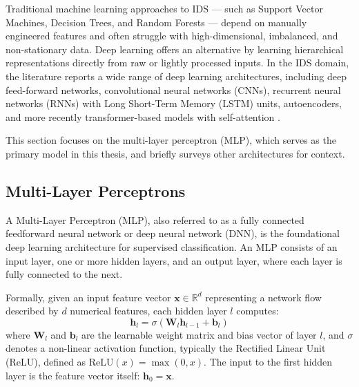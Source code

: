 \par Traditional machine learning approaches to IDS --- such as Support Vector Machines, Decision Trees, and Random Forests --- depend on manually engineered features and often struggle with high-dimensional, imbalanced, and non-stationary data. Deep learning offers an alternative by learning hierarchical representations directly from raw or lightly processed inputs. In the IDS domain, the literature reports a wide range of deep learning architectures, including deep feed-forward networks, convolutional neural networks (CNNs), recurrent neural networks (RNNs) with Long Short-Term Memory (LSTM) units, autoencoders, and more recently transformer-based models with self-attention \cite{Lansky2021, Zhang2025}.

\par This section focuses on the multi-layer perceptron (MLP), which serves as the primary model in this thesis, and briefly surveys other architectures for context.

\subsection{Multi-Layer Perceptrons}
\label{subsec:mlp}

\par A Multi-Layer Perceptron (MLP), also referred to as a fully connected feedforward neural network or deep neural network (DNN), is the foundational deep learning architecture for supervised classification. An MLP consists of an input layer, one or more hidden layers, and an output layer, where each layer is fully connected to the next.

\par Formally, given an input feature vector $\mathbf{x} \in \mathbb{R}^d$ representing a network flow described by $d$ numerical features, each hidden layer $l$ computes:
\begin{equation}
    \mathbf{h}_l = \sigma(\mathbf{W}_l \mathbf{h}_{l-1} + \mathbf{b}_l)
    \label{eq:mlp_hidden}
\end{equation}
where $\mathbf{W}_l$ and $\mathbf{b}_l$ are the learnable weight matrix and bias vector of layer $l$, and $\sigma$ denotes a non-linear activation function, typically the Rectified Linear Unit (ReLU), defined as $\text{ReLU}(x) = \max(0, x)$. The input to the first hidden layer is the feature vector itself: $\mathbf{h}_0 = \mathbf{x}$.

